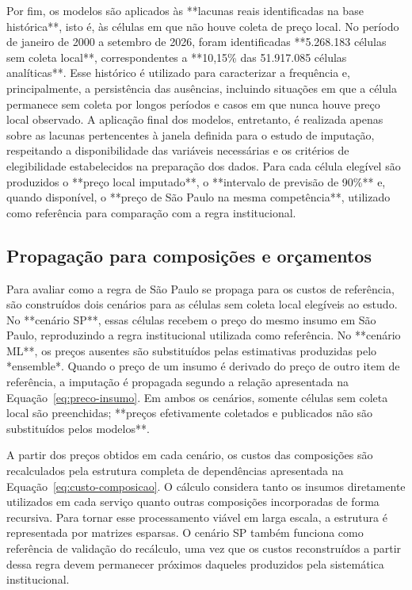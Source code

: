 Por fim, os modelos são aplicados às **lacunas reais identificadas na base histórica**, isto é, às células em que não houve 
coleta de preço local. No período de janeiro de 2000 a setembro de 2026, foram identificadas **5.268.183 células sem coleta 
local**, correspondentes a **10,15\% das 51.917.085 células analíticas**. Esse histórico é utilizado para caracterizar a 
frequência e, principalmente, a persistência das ausências, incluindo situações em que a célula permanece sem coleta por longos 
períodos e casos em que nunca houve preço local observado. A aplicação final dos modelos, entretanto, é realizada apenas 
sobre as lacunas pertencentes à janela definida para o estudo de imputação, respeitando a disponibilidade das variáveis 
necessárias e os critérios de elegibilidade estabelecidos na preparação dos dados. Para cada célula elegível são produzidos o 
**preço local imputado**, o **intervalo de previsão de 90\%** e, quando disponível, o **preço de São Paulo na mesma competência**, 
utilizado como referência para comparação com a regra institucional.

\subsection{Propagação para composições e orçamentos}

Para avaliar como a regra de São Paulo se propaga para os custos de referência, são construídos dois cenários para as 
células sem coleta local elegíveis ao estudo. No **cenário SP**, essas células recebem o preço do mesmo insumo em São Paulo, 
reproduzindo a regra institucional utilizada como referência. No **cenário ML**, os preços ausentes são substituídos pelas 
estimativas produzidas pelo *ensemble*. Quando o preço de um insumo é derivado do preço de outro item de referência, a imputação 
é propagada segundo a relação apresentada na Equação~\ref{eq:preco-insumo}. Em ambos os cenários, somente células sem coleta 
local são preenchidas; **preços efetivamente coletados e publicados não são substituídos pelos modelos**.

A partir dos preços obtidos em cada cenário, os custos das composições são recalculados pela estrutura completa de dependências 
apresentada na Equação~\ref{eq:custo-composicao}. O cálculo considera tanto os insumos diretamente utilizados em cada serviço 
quanto outras composições incorporadas de forma recursiva. Para tornar esse processamento viável em larga escala, a estrutura é 
representada por matrizes esparsas. O cenário SP também funciona como referência de validação do recálculo, uma vez que os custos 
reconstruídos a partir dessa regra devem permanecer próximos daqueles produzidos pela sistemática institucional.

